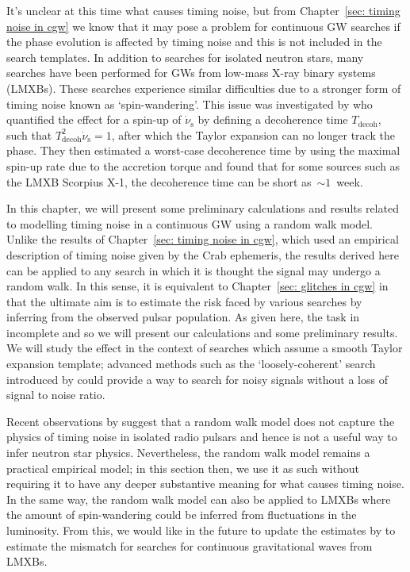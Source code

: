 \documentclass[../full_thesis/full_thesis.tex]{subfiles}
\begin{document}
It's unclear at this time what causes timing noise, but from
Chapter~\ref{sec: timing noise in cgw} we know that it may pose a problem for
continuous GW searches if the phase evolution is affected by timing noise and
this is not included in the search templates. In addition to searches for
isolated neutron stars, many searches \citep[see for
example][]{aasi2015directed,leaci2015,ScoX1:MDC1} have been performed for GWs from
low-mass X-ray binary systems (LMXBs). These searches experience similar
difficulties due to a stronger form of timing noise known as `spin-wandering'.
This issue was investigated by \citet{watts2008} who quantified the effect for
a spin-up of $\dot{\nu}_{\textrm{s}}$ by defining a decoherence time $T_{\mathrm{decoh}}$,
such that $T_{\mathrm{decoh}}^{2} \dot{\nu}_{\textrm{s}} = 1$, after which the Taylor
expansion can no longer track the phase.  They then estimated a worst-case
decoherence time by using the maximal spin-up rate due to the accretion torque
and found that for some sources such as the LMXB Scorpius X-1, the decoherence
time can be short as~$\sim1$~week.

In this chapter, we will present some preliminary calculations and results
related to modelling timing noise in a continuous GW using a random walk model.
Unlike the results of Chapter~\ref{sec: timing noise in cgw}, which used an
empirical description of timing noise given by the Crab ephemeris, the results
derived here can be applied to any search in which it is thought the signal may
undergo a random walk. In this sense, it is equivalent to Chapter~\ref{sec:
glitches in cgw} in that the ultimate aim is to estimate the risk faced by
various searches by inferring from the observed pulsar population.  As given
here, the task in incomplete and so we will present our calculations and
some preliminary results. We will study the effect in the context of searches
which assume a smooth Taylor expansion template; advanced methods such as the
`loosely-coherent' search introduced by \citet{dergachev2010blind} could provide
a way to search for noisy signals without a loss of signal to noise ratio.

Recent observations by \citet{Hobbs2010} suggest that a random walk model does
not capture the physics of timing noise in isolated radio pulsars and hence is
not a useful way to infer neutron star physics. Nevertheless, the random walk
model remains a practical empirical model; in this section then, we use it as
such without requiring it to have any deeper substantive meaning for what
causes timing noise. In the same way, the random walk model can also be applied
to LMXBs where the amount of spin-wandering could be inferred from fluctuations
in the luminosity. From this, we would like in the future to update the estimates by
\citet{watts2008} to estimate the mismatch for searches for continuous gravitational
waves from LMXBs.
\end{document}

